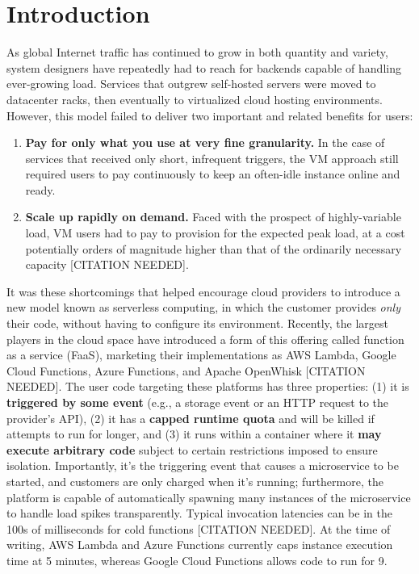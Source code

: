 \section{Introduction}
\label{sec:intro}

As global Internet traffic has continued to grow in both quantity and variety, system designers have repeatedly had to reach for backends capable of handling ever-growing load.
Services that outgrew self-hosted servers were moved to datacenter racks, then eventually to virtualized cloud hosting environments.
However, this model failed to deliver two important and related benefits for users:
\begin{enumerate}
\item \textbf{Pay for only what you use at very fine granularity.} In the case of services that received only short, infrequent triggers, the VM approach still required users to pay continuously to keep an often-idle instance online and ready.
\item \textbf{Scale up rapidly on demand.} Faced with the prospect of highly-variable load, VM users had to pay to provision for the expected peak load, at a cost potentially orders of magnitude higher than that of the ordinarily necessary capacity [CITATION NEEDED].
\end{enumerate}

It was these shortcomings that helped encourage cloud providers to introduce a new model known as serverless computing, in which the customer provides \textit{only} their code, without having to configure its environment.
Recently, the largest players in the cloud space have introduced a form of this offering called function as a service (FaaS), marketing their implementations as AWS Lambda, Google Cloud Functions, Azure Functions, and Apache OpenWhisk [CITATION NEEDED].
The user code targeting these platforms has three properties: (1) it is \textbf{triggered by some event} (e.g., a storage event or an HTTP request to the provider's API), (2) it has a \textbf{capped runtime quota} and will be killed if attempts to run for longer, and (3) it runs within a container where it \textbf{may execute arbitrary code} subject to certain restrictions imposed to ensure isolation.
Importantly, it's the triggering event that causes a microservice to be started, and customers are only charged when it's running; furthermore, the platform is capable of automatically spawning many instances of the microservice to handle load spikes transparently.
Typical invocation latencies can be in the 100s of milliseconds for cold functions [CITATION NEEDED].
At the time of writing, AWS Lambda and Azure Functions currently caps instance execution time at 5 minutes, whereas Google Cloud Functions allows code to run for 9.

